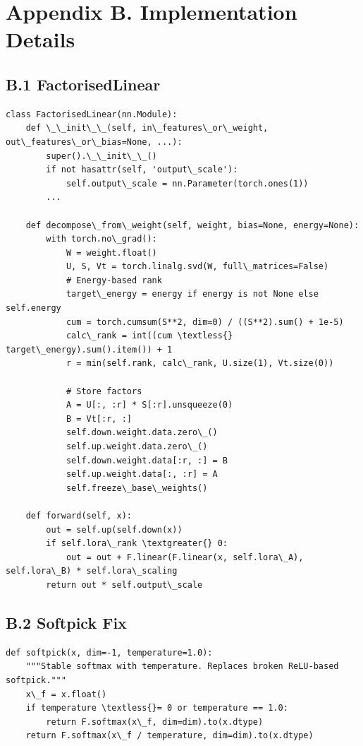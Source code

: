 \section{Appendix B. Implementation Details}

\subsection{B.1 FactorisedLinear}

\begin{lstlisting}
class FactorisedLinear(nn.Module):
    def \_\_init\_\_(self, in\_features\_or\_weight, out\_features\_or\_bias=None, ...):
        super().\_\_init\_\_()
        if not hasattr(self, 'output\_scale'):
            self.output\_scale = nn.Parameter(torch.ones(1))
        ...
    
    def decompose\_from\_weight(self, weight, bias=None, energy=None):
        with torch.no\_grad():
            W = weight.float()
            U, S, Vt = torch.linalg.svd(W, full\_matrices=False)
            # Energy-based rank
            target\_energy = energy if energy is not None else self.energy
            cum = torch.cumsum(S**2, dim=0) / ((S**2).sum() + 1e-5)
            calc\_rank = int((cum \textless{} target\_energy).sum().item()) + 1
            r = min(self.rank, calc\_rank, U.size(1), Vt.size(0))
            
            # Store factors
            A = U[:, :r] * S[:r].unsqueeze(0)
            B = Vt[:r, :]
            self.down.weight.data.zero\_()
            self.up.weight.data.zero\_()
            self.down.weight.data[:r, :] = B
            self.up.weight.data[:, :r] = A
            self.freeze\_base\_weights()
    
    def forward(self, x):
        out = self.up(self.down(x))
        if self.lora\_rank \textgreater{} 0:
            out = out + F.linear(F.linear(x, self.lora\_A), self.lora\_B) * self.lora\_scaling
        return out * self.output\_scale
\end{lstlisting}

\subsection{B.2 Softpick Fix}

\begin{lstlisting}
def softpick(x, dim=-1, temperature=1.0):
    """Stable softmax with temperature. Replaces broken ReLU-based softpick."""
    x\_f = x.float()
    if temperature \textless{}= 0 or temperature == 1.0:
        return F.softmax(x\_f, dim=dim).to(x.dtype)
    return F.softmax(x\_f / temperature, dim=dim).to(x.dtype)
\end{lstlisting}

